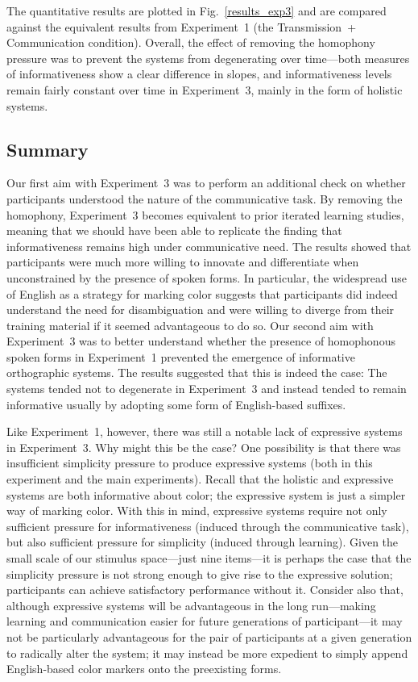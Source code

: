 \documentclass[doc,biblatex]{apa7}
\begin{document}
The quantitative results are plotted in Fig.~\ref{results_exp3} and are compared against the equivalent results from Experiment~1 (the Transmission~+ Communication condition). Overall, the effect of removing the homophony pressure was to prevent the systems from degenerating over time---both measures of informativeness show a clear difference in slopes, and informativeness levels remain fairly constant over time in Experiment~3, mainly in the form of holistic systems.

\subsection{Summary}

Our first aim with Experiment~3 was to perform an additional check on whether participants understood the nature of the communicative task. By removing the homophony, Experiment~3 becomes equivalent to prior iterated learning studies, meaning that we should have been able to replicate the finding that informativeness remains high under communicative need. The results showed that participants were much more willing to innovate and differentiate when unconstrained by the presence of spoken forms. In particular, the widespread use of English as a strategy for marking color suggests that participants did indeed understand the need for disambiguation and were willing to diverge from their training material if it seemed advantageous to do so. Our second aim with Experiment~3 was to better understand whether the presence of homophonous spoken forms in Experiment~1 prevented the emergence of informative orthographic systems. The results suggested that this is indeed the case: The systems tended not to degenerate in Experiment~3 and instead tended to remain informative usually by adopting some form of English-based suffixes.

Like Experiment~1, however, there was still a notable lack of expressive systems in Experiment~3. Why might this be the case? One possibility is that there was insufficient simplicity pressure to produce expressive systems (both in this experiment and the main experiments). Recall that the holistic and expressive systems are both informative about color; the expressive system is just a simpler way of marking color. With this in mind, expressive systems require not only sufficient pressure for informativeness (induced through the communicative task), but also sufficient pressure for simplicity (induced through learning). Given the small scale of our stimulus space---just nine items---it is perhaps the case that the simplicity pressure is not strong enough to give rise to the expressive solution; participants can achieve satisfactory performance without it. Consider also that, although expressive systems will be advantageous in the long run---making learning and communication easier for future generations of participant---it may not be particularly advantageous for the pair of participants at a given generation to radically alter the system; it may instead be more expedient to simply append English-based color markers onto the preexisting forms.
\end{document}
